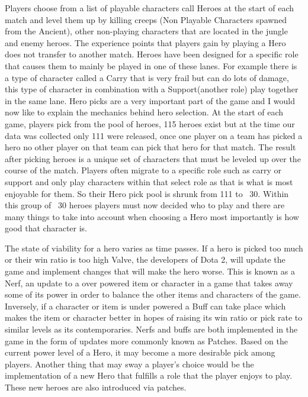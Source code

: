 Players choose from a list of playable characters call Heroes at the start of each match and level them up by killing creeps (Non Playable Characters spawned from the Ancient), other non-playing characters that are located in the jungle and enemy heroes. The experience points that players gain by playing a Hero does not transfer to another match. Heroes have been designed for a specific role that causes them to mainly be played in one of these lanes. For example there is a type of character called a Carry that is very frail but can do lots of damage, this type of character in combination with a Support(another role) play together in the same lane. Hero picks are a very important part of the game and I would now like to explain the mechanics behind hero selection. At the start of each game, players pick from the pool of heroes, 115 heroes exist but at the time our data was collected only 111 were released, once one player on a team has picked a hero no other player on that team can pick that hero for that match. The result after picking heroes is a unique set of characters that must be leveled up over the course of the match. Players often migrate to a specific role such as carry or support and only play characters within that select role as that is what is most enjoyable for them. So their Hero pick pool is shrunk from 111 to ~30. Within this group of ~30 heroes players must now decided who to play and there are many things to take into account when choosing a Hero most importantly is how good that character is.

The state of viability for a hero varies as time passes. If a hero is picked too much or their win ratio is too high Valve, the developers of Dota 2, will update the game and implement changes that will make the hero worse. This is known as a Nerf, an update to a over powered item or character in a game that takes away some of its power in order to balance the other items and characters of the game. Inversely, if a character or item is under powered a Buff can take place which makes the item or character better in hopes of raising its win ratio or pick rate to similar levels as its contemporaries. Nerfs and buffs are both implemented in the game in the form of updates more commonly known as Patches. Based on the current power level of a Hero, it may become a more desirable pick among players. Another thing that may sway a player's choice would be the implementation of a new Hero that fulfills a role that the player enjoys to play. These new heroes are also introduced via patches.

